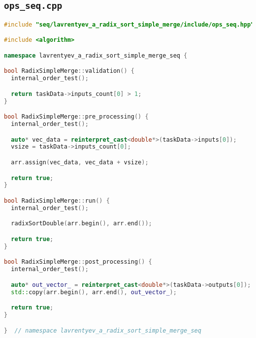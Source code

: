 \documentclass[12pt]{article}
\begin{document}
\subsection*{\texttt{ops\_seq.cpp}}

\begin{lstlisting}[language=C++]
#include "seq/lavrentyev_a_radix_sort_simple_merge/include/ops_seq.hpp"

#include <algorithm>

namespace lavrentyev_a_radix_sort_simple_merge_seq {

bool RadixSimpleMerge::validation() {
  internal_order_test();

  return taskData->inputs_count[0] > 1;
}

bool RadixSimpleMerge::pre_processing() {
  internal_order_test();

  auto* vec_data = reinterpret_cast<double*>(taskData->inputs[0]);
  vsize = taskData->inputs_count[0];

  arr.assign(vec_data, vec_data + vsize);

  return true;
}

bool RadixSimpleMerge::run() {
  internal_order_test();

  radixSortDouble(arr.begin(), arr.end());

  return true;
}

bool RadixSimpleMerge::post_processing() {
  internal_order_test();

  auto* out_vector_ = reinterpret_cast<double*>(taskData->outputs[0]);
  std::copy(arr.begin(), arr.end(), out_vector_);

  return true;
}

}  // namespace lavrentyev_a_radix_sort_simple_merge_seq
\end{lstlisting}
\end{document}
